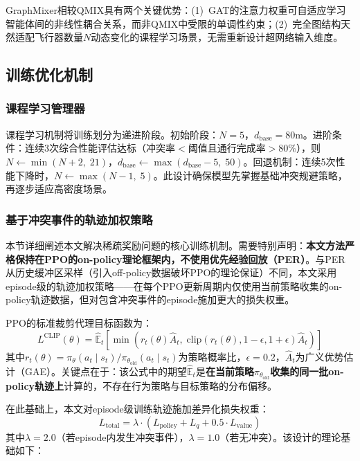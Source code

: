 \documentclass[12pt,a4paper,UTF8]{ctexart}
\begin{document}
GraphMixer相较QMIX具有两个关键优势：(1)~GAT的注意力权重可自适应学习智能体间的非线性耦合关系，而非QMIX中受限的单调性约束；(2)~完全图结构天然适配飞行器数量$N$动态变化的课程学习场景，无需重新设计超网络输入维度。

\subsection{训练优化机制}

\subsubsection{课程学习管理器}

课程学习机制将训练划分为递进阶段。初始阶段：$N=5$，$d_{\text{base}}=80\text{m}$。进阶条件：连续3次综合性能评估达标（冲突率$<$阈值且通行完成率$>80\%$），则$N \leftarrow \min(N+2,\; 21)$，$d_{\text{base}} \leftarrow \max(d_{\text{base}}-5,\; 50)$。回退机制：连续5次性能下降时，$N \leftarrow \max(N-1,\; 5)$。此设计确保模型先掌握基础冲突规避策略，再逐步适应高密度场景。

\subsubsection{基于冲突事件的轨迹加权策略}

本节详细阐述本文解决稀疏奖励问题的核心训练机制。需要特别声明：\textbf{本文方法严格保持在PPO的on-policy理论框架内，不使用优先经验回放（PER）}。与PER从历史缓冲区采样（引入off-policy数据破坏PPO的理论保证）不同，本文采用episode级的轨迹加权策略——在每个PPO更新周期内仅使用当前策略收集的on-policy轨迹数据，但对包含冲突事件的episode施加更大的损失权重。

PPO的标准裁剪代理目标函数\cite{ref11,ref17}为：
\begin{equation}
    L^{\text{CLIP}}(\theta) = \hat{\mathbb{E}}_t\left[\min\left(r_t(\theta)\hat{A}_t,\; \text{clip}(r_t(\theta), 1-\epsilon, 1+\epsilon)\hat{A}_t\right)\right]
    \label{eq:ppo_clip}
\end{equation}
其中$r_t(\theta) = \pi_\theta(a_t \mid s_t) / \pi_{\theta_{\text{old}}}(a_t \mid s_t)$为策略概率比，$\epsilon = 0.2$，$\hat{A}_t$为广义优势估计（GAE）。关键点在于：该公式中的期望$\hat{\mathbb{E}}_t$是\textbf{在当前策略$\pi_{\theta_{\text{old}}}$收集的同一批on-policy轨迹上}计算的，不存在行为策略与目标策略的分布偏移。

在此基础上，本文对episode级训练轨迹施加差异化损失权重：
\begin{equation}
    L_{\text{total}} = \lambda \cdot \left(L_{\text{policy}} + L_{q} + 0.5 \cdot L_{\text{value}}\right)
    \label{eq:weighted_loss}
\end{equation}
其中$\lambda = 2.0$（若episode内发生冲突事件），$\lambda = 1.0$（若无冲突）。该设计的理论基础如下：
\end{document}

